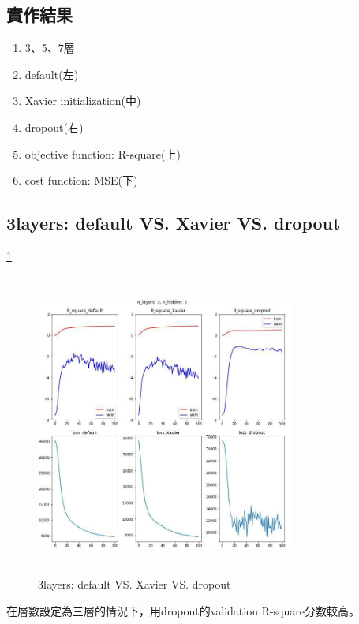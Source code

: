 \documentclass[conference,twocolumn]{IEEEtran}
\theoremstyle{definition}
\begin{document}
\begin{singlespace}
\section{實作結果}
\begin{enumerate}
\item 3、5、7層
\item default(左)
\item Xavier initialization(中)
\item dropout(右)
\item objective function: R-square(上)
\item cost function: MSE(下)
\end{enumerate}

\subsection{3layers: default VS. Xavier VS. dropout}\ref{f1}

\begin{figure}
\centerline{\includegraphics[width=8.5cm, height=10cm]{f1.jpg}}
\caption{3layers: default VS. Xavier VS. dropout}
\label{f1}
\end{figure}
在層數設定為三層的情況下，用dropout的validation R-square分數較高。
\end{singlespace}
\end{document}
